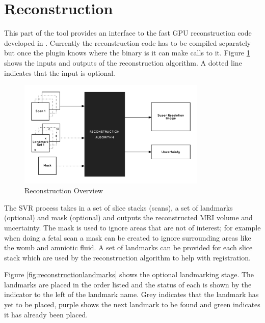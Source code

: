 
\clearpage
\section{Reconstruction}\label{implementation:reconstruction}
This part of the tool provides an interface to the fast GPU reconstruction code developed in \cite{uncertaintysvd}. Currently the reconstruction code has to be compiled separately but once the plugin knows where the binary is it can make calls to it. Figure \ref{fig:reconstruction_overview} shows the inputs and outputs of the reconstruction algorithm. A dotted line indicates that the input is optional.

\begin{figure}[h]
  \centering
  \includegraphics[width=0.8\textwidth]{images/reconstruction_overview.png}
  \caption{Reconstruction Overview}
  \label{fig:reconstruction_overview}
\end{figure}

The SVR process takes in a set of slice stacks (scans), a set of landmarks (optional) and mask (optional) and outputs the reconstructed MRI volume and uncertainty. The mask is used to ignore areas that are not of interest; for example when doing a fetal scan a mask can be created to ignore surrounding areas like the womb and amniotic fluid. A set of landmarks can be provided for each slice stack which are used by the reconstruction algorithm to help with registration.

Figure \ref{fig:reconstructionlandmarks} shows the optional landmarking stage. The landmarks are placed in the order listed and the status of each is shown by the indicator to the left of the landmark name. Grey indicates that the landmark has yet to be placed, purple shows the next landmark to be found and green indicates it has already been placed. 

